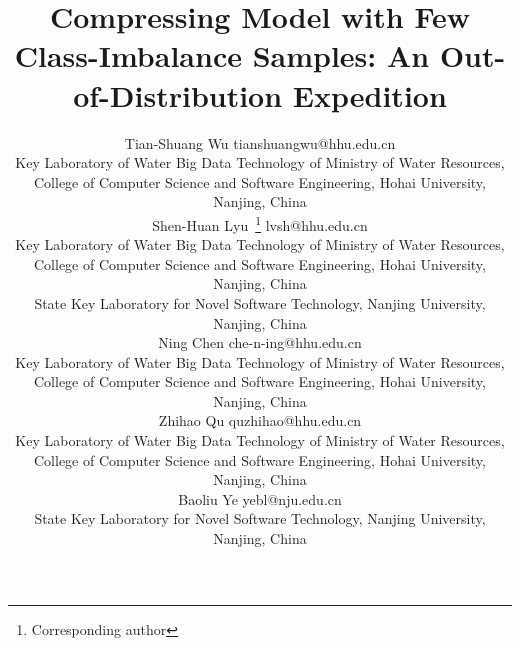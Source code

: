 \documentclass[twoside,11pt]{article}
\begin{document}
\title{Compressing Model with Few Class-Imbalance Samples: An Out-of-Distribution Expedition}

\author{\name Tian-Shuang Wu \email tianshuangwu@hhu.edu.cn \\
\addr Key Laboratory of Water Big Data Technology of Ministry of Water Resources,\\ College of Computer Science and Software Engineering, Hohai University, Nanjing, China\\
\AND
\name Shen-Huan Lyu~\thanks{Corresponding author} \email lvsh@hhu.edu.cn \\
\addr Key Laboratory of Water Big Data Technology of Ministry of Water Resources,\\ College of Computer Science and Software Engineering, Hohai University, Nanjing, China\\
\addr State Key Laboratory for Novel Software Technology,
Nanjing University, Nanjing, China\\
\AND
\name Ning Chen \email che-n-ing@hhu.edu.cn\\
\addr Key Laboratory of Water Big Data Technology of Ministry of Water Resources,\\ College of Computer Science and Software Engineering, Hohai University, Nanjing, China\\
\AND
\name Zhihao Qu \email quzhihao@hhu.edu.cn\\
\addr Key Laboratory of Water Big Data Technology of Ministry of Water Resources,\\ College of Computer Science and Software Engineering, Hohai University, Nanjing, China\\
\AND
\name Baoliu Ye \email yebl@nju.edu.cn\\
\addr State Key Laboratory for Novel Software Technology,
Nanjing University, Nanjing, China
       }


\maketitle
\end{document}
